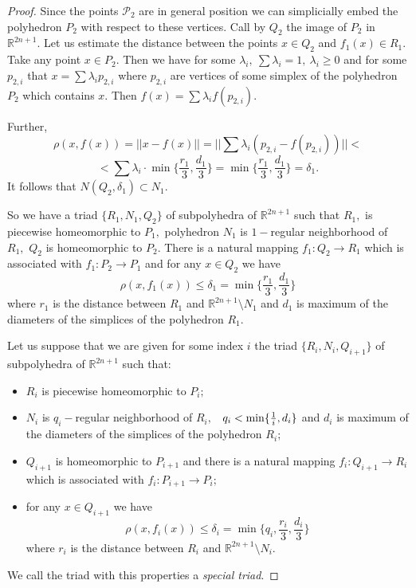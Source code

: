 \begin{proof}
Since the points $\mathcal{P}_2$ are in general position we can
simplicially embed  the polyhedron $P_2$ with respect to these
vertices. Call by $Q_2$ the image of $P_2$ in $\mathbb{R}^{2n+1}.$
Let us estimate the distance between the points $x\in Q_2$ and
$f_1(x)\in R_1.$ Take any point $x\in P_2.$ Then we have for some
$\lambda_i,\ \sum \lambda_i = 1,\ \lambda_i \geq 0$ and for some
$p_{2,i}$ that $x = \sum \lambda_ip_{2,i}$ where $p_{2,i}$ are
vertices of some simplex of the polyhedron $P_2$ which contains
$x.$ Then $f(x) = \sum \lambda_if(p_{2,i}).$ 

Further, $$\rho(x,
f(x)) = ||x-f(x)|| = ||\sum \lambda_i(p_{2,i}-f(p_{2,i}))|| <$$  
$$ < \sum
\lambda_i\cdot \min\{\frac{r_1}{3}, \frac{d_1}{3}\} =
\min\{\frac{r_1}{3}, \frac{d_1}{3}\} = \delta_1.$$ 
It follows that
$N(Q_2, \delta_1) \subset N_1.$

So we have a triad $\{R_1, N_1, Q_2\}$ of subpolyhedra of
$\mathbb{R}^{2n+1}$ such that $R_1,$ is piecewise homeomorphic to
$P_1,$ polyhedron $N_1$ is $1-$regular neighborhood of $R_1,$
$Q_2$ is homeomorphic to $P_2.$ There is a natural mapping $f_1:
Q_2\to R_1 $ which is associated with $f_1:P_2 \to P_1$ and for
any $x\in Q_{2}$ we have 
$$\rho(x, f_1(x))\leq \delta_1 =
\min\{\frac{r_1}{3}, \frac{d_1}{3}\}$$
where $r_1$ is the distance
between $R_1$ and $\mathbb{R}^{2n+1}\setminus N_1$ and $d_1$ is
maximum of the diameters of the simplices of the polyhedron $R_1.$

Let us suppose that we are given for some index $i$ the triad
$\{R_i, N_i, Q_{i+1}\}$ of subpolyhedra of $\mathbb{R}^{2n+1}$
such that:
\begin{itemize}
    \item $R_i$ is piecewise homeomorphic to $P_i;$
    \item $N_i$ is $q_i-$regular neighborhood of $R_i,$ \ $q_i < {\rm
min}\{\frac{1}{i}, d_i\}$ and $d_i$ is maximum of the diameters of
the simplices of the polyhedron $R_i;$
    \item $Q_{i+1}$ is homeomorphic to $P_{i+1}$ and there is a natural mapping $f_{i}: Q_{i+1}\to R_i$ which is
associated with $f_{i}:P_{i+1} \to P_i;$
    \item for any $x\in Q_{i+1}$ we have $$\rho(x, f_i(x))\leq \delta_i = \min\{q_i,
\frac{r_i}{3}, \frac{d_i}{3}\}$$
where $r_i$ is the distance
between $R_i$ and $\mathbb{R}^{2n+1}\setminus N_i.$
\end{itemize}

We call the triad with this properties a {\it special triad}.


\end{proof}
